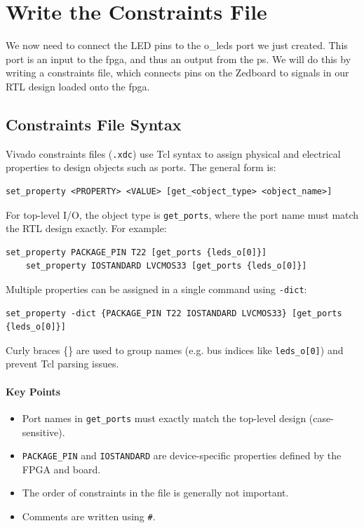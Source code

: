 \section{Write the Constraints File}

    We now need to connect the LED pins to the o\_leds port we just created. This port is an input to the \gls{fpga}, and thus an output from the \gls{ps}. We will do this by writing a constraints file, which connects pins on the Zedboard to signals in our RTL design loaded onto the \gls{fpga}.

    \subsection{Constraints File Syntax}

    Vivado constraints files (\texttt{.xdc}) use Tcl syntax to assign physical and electrical properties to design objects such as ports. The general form is:

    \begin{lstlisting}[style=xdc]
    set_property <PROPERTY> <VALUE> [get_<object_type> <object_name>]
    \end{lstlisting}

    For top-level I/O, the object type is \texttt{get\_ports}, where the port name must match the RTL design exactly. For example:

    \begin{lstlisting}[style=xdc]
    set_property PACKAGE_PIN T22 [get_ports {leds_o[0]}]
    set_property IOSTANDARD LVCMOS33 [get_ports {leds_o[0]}]
    \end{lstlisting}

    Multiple properties can be assigned in a single command using \texttt{-dict}:

    \begin{lstlisting}[style=xdc]
    set_property -dict {PACKAGE_PIN T22 IOSTANDARD LVCMOS33} [get_ports {leds_o[0]}]
    \end{lstlisting}

    Curly braces \{\} are used to group names (e.g. bus indices like \texttt{leds\_o[0]}) and prevent Tcl parsing issues.

    \paragraph{Key Points}
    \begin{itemize}
        \item Port names in \texttt{get\_ports} must exactly match the top-level design (case-sensitive).
        \item \texttt{PACKAGE\_PIN} and \texttt{IOSTANDARD} are device-specific properties defined by the FPGA and board.
        \item The order of constraints in the file is generally not important.
        \item Comments are written using \texttt{\#}.
    \end{itemize}

